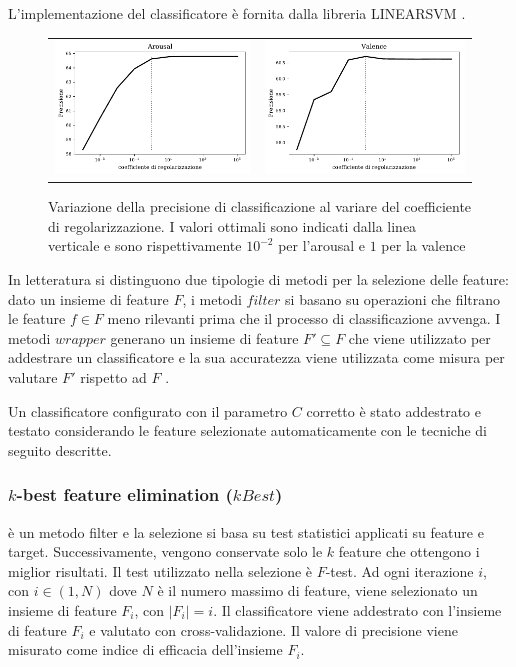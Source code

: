 L'implementazione del classificatore è fornita dalla libreria LINEARSVM \cite{fan2008liblinear}.

\begin{figure}
\begin{tabular}{cc}
 \includegraphics[width=.45\textwidth]{img/reg_coef_aro.pdf} & \includegraphics[width=.45\textwidth]{img/reg_coef_val.pdf}
\end{tabular}
\caption{Variazione della precisione di classificazione al variare del coefficiente di regolarizzazione. I valori ottimali sono indicati dalla linea verticale e sono rispettivamente $10^{-2}$ per l'arousal e $1$ per la valence}
\label{img:regolarization_test}
\end{figure}

In letteratura si distinguono due tipologie di metodi per la selezione delle feature: dato un insieme di feature $F$, i metodi $filter$ si basano su operazioni che filtrano le feature $f \in F$ meno rilevanti prima che il processo di classificazione avvenga. I metodi $wrapper$ generano un insieme di feature $F' \subseteq F$ che viene utilizzato per addestrare un classificatore e la sua accuratezza viene utilizzata come misura per valutare $F'$ rispetto ad $F$ \cite{langley1994selection}.

Un classificatore configurato con il parametro $C$ corretto è stato addestrato e testato considerando le feature selezionate automaticamente con le tecniche di seguito descritte.

\subsubsection*{$k$-best feature elimination ($kBest$)} è un metodo filter e la selezione si basa su test statistici applicati su feature e target. Successivamente, vengono conservate solo le $k$ feature che ottengono i miglior risultati. Il test utilizzato nella selezione è $F$-test. Ad ogni iterazione $i$, con $i \in (1, N)$ dove $N$ è il numero massimo di feature, viene selezionato un insieme di feature $F_{i}$, con $|F_{i}|=i$. Il classificatore viene addestrato con l'insieme di feature $F_{i}$ e valutato con cross-validazione. Il valore di precisione viene misurato come indice di efficacia dell'insieme $F_{i}$.

